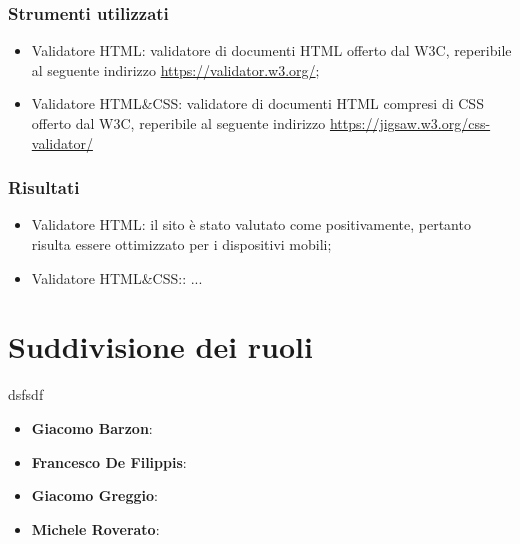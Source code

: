 \documentclass[12pt]{article}
\begin{document}
	\subsubsection{Strumenti utilizzati}
	\begin{itemize}
		\item Validatore HTML: validatore di documenti HTML offerto dal W3C, reperibile al seguente indirizzo \url{https://validator.w3.org/};
		\item Validatore HTML\&CSS: validatore di documenti HTML compresi di CSS offerto dal W3C, reperibile al seguente indirizzo \url{https://jigsaw.w3.org/css-validator/}
	\end{itemize}
	\subsubsection{Risultati}
		\begin{itemize}
			\item Validatore HTML: il sito è stato valutato come positivamente, pertanto risulta essere ottimizzato per i dispositivi mobili;
			\item Validatore HTML\&CSS:: ...
		\end{itemize}
	
	\section{Suddivisione dei ruoli}
	dsfsdf
	\begin{itemize}
		\item \textbf{Giacomo Barzon}:
		\item \textbf{Francesco De Filippis}: 
		\item \textbf{Giacomo Greggio}:
		\item \textbf{Michele Roverato}:
	\end{itemize}
\end{document}
